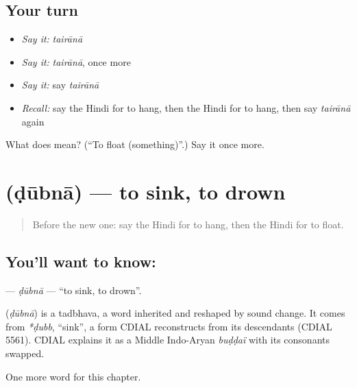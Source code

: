 \subsection*{Your turn}
\begin{itemize}
\raggedright
  \item \emph{Say it:} \emph{tairānā}
  \item \emph{Say it:} \emph{tairānā}, once more
  \item \emph{Say it:} say \emph{tairānā}
  \item \emph{Recall:} say the Hindi for to hang, then the Hindi for to hang, then say \emph{tairānā} again
\end{itemize}

\begin{tcolorbox}[breakable,colback=teal!4,colframe=teal!35!black,title={Before you move on}]
What does  mean? (\textquotedblleft{}To float (something)\textquotedblright{}.) Say it once more.
\end{tcolorbox}
\section[\texorpdfstring{\hi{डूबना} (ḍūbnā)}{डूबना (ḍūbnā)}]{ (ḍūbnā) — to sink, to drown}

\label{lesson:HI-C230-dubna}



\begin{quote}
Before the new one: say the Hindi for to hang, then the Hindi for to float.
\end{quote}

\subsection*{You'll want to know: }
\textbf{} — \emph{ḍūbnā} — \textquotedblleft{}to sink, to drown\textquotedblright{}.

\begin{cousinweb}
\textbf{} (\emph{ḍūbnā}) is a tadbhava, a word inherited and reshaped by sound change. It comes from \emph{*ḍubb}, \textquotedblleft{}sink\textquotedblright{}, a form CDIAL reconstructs from its descendants (CDIAL 5561). CDIAL explains it as a Middle Indo-Aryan \emph{buḍḍaï} with its consonants swapped.
\end{cousinweb}

\begin{grammarlens}[title={What you've built}]
One more word for this chapter.
\end{grammarlens}


